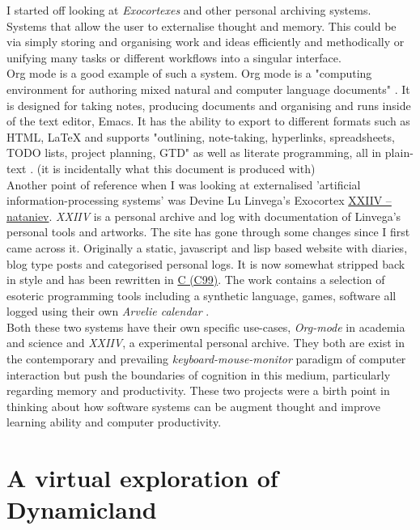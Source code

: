 \documentclass[12pt]{report}
\begin{document}
I started off looking at \emph{Exocortexes} and other personal archiving systems.
Systems that allow the user to externalise thought and memory. This could be via
simply storing and organising work and ideas efficiently and methodically or
unifying many tasks or different workflows into a singular interface. \\

Org mode is a good example of such a system. Org mode is a "computing
environment for authoring mixed natural and computer language documents"
\cite{Schulte:Davison:Dye:Dominik:2011:JSSOBK:v46i03}. It is designed for taking
notes, producing documents and organising and runs inside of the text editor,
Emacs. It has the ability to export to different formats such as HTML, \LaTeX{} and
supports "outlining, note-taking, hyperlinks, spreadsheets, TODO lists, project
planning, GTD" as well as literate programming, all in plain-text
\cite{Schulte:Davison:Dye:Dominik:2011:JSSOBK:v46i03}. (it is incidentally what
this document is produced with) \\


Another point of reference when I was looking at externalised 'artificial
information-processing systems' was Devine Lu Linvega's Exocortex \href{https://wiki.xxiivv.com/site/nataniev.html}{XXIIV --
nataniev}. \emph{XXIIV} is a personal archive and log with documentation of Linvega's
personal tools and artworks. The site has gone through some changes since I
first came across it. Originally a static, javascript and lisp based website
with diaries, blog type posts and categorised personal logs. It is now somewhat
stripped back in style and has been rewritten in \href{https://en.wikipedia.org/wiki/C99}{C (C99)}. The work contains a
selection of esoteric programming tools including a synthetic language, games,
software all logged using their own \emph{Arvelie calendar} \cite{DevineNataniev}. \\

Both these two systems have their own specific use-cases, \emph{Org-mode} in academia
and science and \emph{XXIIV}, a experimental personal archive. They both
are exist in the contemporary and prevailing \emph{keyboard-mouse-monitor} paradigm
of computer interaction but push the boundaries of cognition in this medium,
particularly regarding memory and productivity. These two projects were a birth
point in thinking about how software systems can be augment thought and
improve learning ability and computer productivity.


\section{A virtual exploration of Dynamicland}
\label{sec:org451e4df}
\end{document}
